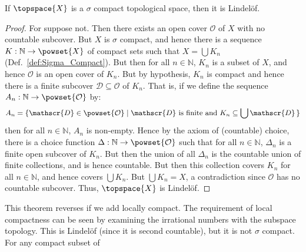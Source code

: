 \documentclass{article}                                                        %
\begin{document}
            \begin{theorem}
                \label{thm:Sigma_Compact_Implies_Lindelof}%
                If $\topspace{X}$ is a $\sigma$ compact topological space, then it
                is Lindel\"{o}f.
            \end{theorem}
            \begin{proof}
                For suppose not. Then there exists an open cover $\mathcal{O}$ of
                $X$ with no countable subcover. But $X$ is $\sigma$ compact, and
                hence there is a sequence $K:\mathbb{N}\rightarrow\powset{X}$ of
                compact sets such that $X=\bigcup{K}_{n}$
                (Def.~\ref{def:Sigma_Compact}). But then for all $n\in\mathbb{N}$,
                $K_{n}$ is a subset of $X$, and hence $\mathcal{O}$ is an open cover
                of $K_{n}$. But by hypothesis, $K_{n}$ is compact and hence there is
                a finite subcover $\mathscr{D}\subseteq\mathcal{O}$ of $K_{n}$. That
                is, if we define the sequence
                $A_{n}:\mathbb{N}\rightarrow\powset{\mathcal{O}}$ by:
                \begin{equation}
                    A_{n}=\{\mathscr{D}\in\powset{\mathcal{O}}\;|\;
                        \mathscr{D}\textrm{ is finite and }
                        K_{n}\subseteq\bigcup\mathscr{D}\,\}
                \end{equation}
                then for all $n\in\mathbb{N}$, $A_{n}$ is non-empty. Hence by the
                axiom of (countable) choice, there is a choice function
                $\Delta:\mathbb{N}\rightarrow\powset{\mathcal{O}}$ such that for all
                $n\in\mathbb{N}$, $\Delta_{n}$ is a finite open subcover of $K_{n}$.
                But then the union of all $\Delta_{n}$ is the countable union of
                finite collections, and is hence countable. But then this collection
                covers $K_{n}$ for all $n\in\mathbb{N}$, and hence covers
                $\bigcup{K}_{n}$. But $\bigcup{K}_{n}=X$, a contradiction since
                $\mathcal{O}$ has no countable subcover. Thus, $\topspace{X}$ is
                Lindel\"{o}f.
            \end{proof}
            This theorem reverses if we add locally compact. The requirement of
            local compactness can be seen by examining the irrational numbers with
            the subspace topology. This is Lindel\"{o}f (since it is second
            countable), but it is not $\sigma$ compact. For any compact subset of
\end{document}
